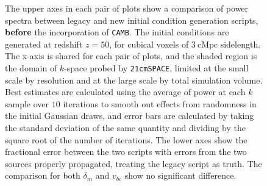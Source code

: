 \documentclass[floats,floatfix,showpacs,amssymb,prd,superscriptaddress,nofootinbib, 11pt]{revtex4-2} %
\newcommand{\code}{\texttt}
\begin{document}
\begin{figure}[H]
\begin{subfigure}[b]{0.8\textwidth}
         \label{fig:compare_generators_power_spectrum_noCAMB_vbc}
     \end{subfigure}
        \caption{The upper axes in each pair of plots show a comparison of power spectra between legacy and new initial condition generation scripts, \textbf{before} the incorporation of \code{CAMB}. The initial conditions are generated at redshift $z = 50$, for cubical voxels of $3 ~\text{cMpc}$ sidelength. The x-axis is shared for each pair of plots, and the shaded region is the domain of $k$-space probed by \code{21cmSPACE}, limited at the small scale by resolution and at the large scale by total simulation volume. Best estimates are calculated using the average of power at each $k$ sample over $10$ iterations to smooth out effects from randomness in the initial Gaussian draws, and error bars are calculated by taking the standard deviation of the same quantity and dividing by the square root of the number of iterations. The lower axes show the fractional error between the two scripts with errors from the two sources properly propagated, treating the legacy script as truth. The comparison for both $\delta_m$ and $v_{bc}$ show no significant difference.}
        \label{fig:compare_generators_noCAMB}
\end{figure}
\end{document}
